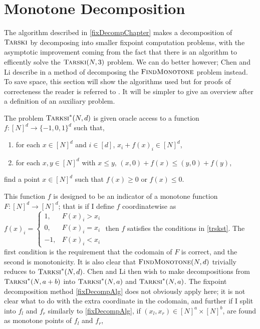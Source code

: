 \section{Monotone Decomposition} \label{monotoneDecompChap}
The algorithm described in \cref{fixDecompChapter} makes a decomposition
of $\textsc{Tarski}$ by decomposing into smaller fixpoint computation problems, with
the asymptotic improvement coming from the fact that there is an algorithm
to efficently solve the $\textsc{Tarski}(N, 3)$ problem. We can do better however;
Chen and Li describe in \citep{chenLi} a method of decomposing the $\textsc{FindMonotone}$
problem instead. To save space, this section will show the algorithms used
but for proofs of correcteness the reader is referred to \citep{chenLi}.
It will be simpler to give an overview after a definition of 
an auxiliary problem.
\newcommand{\trskst}{\textsc{Tarksi}^*}
\begin{definition}[$\trskst$, \citep{chenLi}] \label{trskst}
  The problem $\trskst(N, d)$ is given oracle access to a function $f : [N]^d \to \{-1, 0, 1\}^d$
  such that,
  \begin{enumerate}
    \item for each $x \in [N]^d$ and $i \in [d]$, $x_i + f(x)_i \in [N]^d$,
    \item for each $x, y \in [N]^d$ with $x \leq y$, $(x, 0) + f(x) \leq (y, 0) + f(y)$,
  \end{enumerate}
  find a point $x \in [N]^d$ such that $f(x) \geq 0$ or $f(x) \leq 0$.
\end{definition}
This function $f$ is designed to be an indicator of a monotone function $F : [N]^d \to [N]^d$;
that is if I define $f$ coordinatewise as 
$f(x)_i = \begin{cases} 1, & F(x)_i > x_i \\ 0, & F(x)_i = x_i \\ -1, & F(x)_i < x_i \end{cases}$
then $f$ satisfies the conditions in \cref{trskst}. The first condition is the requirement that
the codomain of $F$ is correct, and the second is monotonicity. It is also clear that $\textsc{FindMonotone}(N, d)$ 
trivially reduces to $\trskst(N, d)$. Chen and Li then wish to make decompositions from
$\trskst(N, a + b)$ into $\trskst(N, a)$ and $\trskst(N, a)$. The fixpoint decomposition
method \cref{fixDecompAlg} does not obviously apply here; it is not clear what to do with the extra
coordinate in the codomain, and further if I split into $f_l$ and $f_r$ similarly to \cref{fixDecompAlg},
if $(x_l, x_r) \in [N]^a \times [N]^b$, are found as monotone points of $f_l$ and $f_r$,
